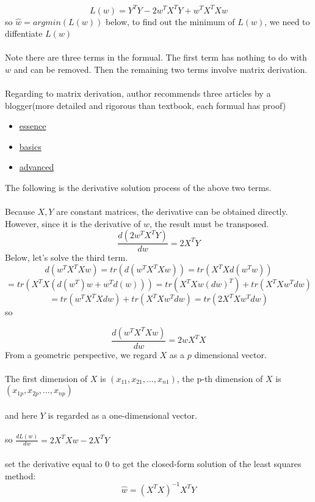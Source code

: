 \documentclass{report}
\begin{document}
$$
L(w)=Y^TY-2w^TX^TY+w^TX^TXw
$$
so $\hat{w}=argmin(L(w))$
below, to find out the minimum of $L(w)$, we need to diffentiate $L(w)$\\\\
Note there are three terms in the formual. The first term has nothing to do with $w$ and can be removed. Then the remaining two terms involve matrix derivation.\\\\
Regarding to matrix derivation, author recommends three articles by a blogger(more detailed and rigorous than textbook, each formual has proof)
\begin{itemize}
	\item \href{https://zhuanlan.zhihu.com/p/263777564}{essence}
	\item \href{https://zhuanlan.zhihu.com/p/273729929}{basics}
	\item \href{https://zhuanlan.zhihu.com/p/288541909}{advanced}
\end{itemize}
The following is the derivative solution process of the above two terms.\\\\
Because $X,Y$ are constant matrices, the derivative can be obtained directly. However, since it is the derivative of $w$, the result must be transposed.
$$
\frac{d(2w^TX^TY)}{dw}=2X^TY
$$
Below, let's solve the third term.
$$
d(w^TX^TXw)=tr(d(w^TX^TXw))=tr(X^TXd(w^Tw))
$$
$$
=tr(X^TX(d(w^T)w+w^Td(w)))=tr(X^TXw(dw)^T)+tr(X^TXw^Tdw)
$$
$$
=tr(w^TX^TXdw)+tr(X^TXw^Tdw)=tr(2X^TXw^Tdw)
$$
so

$$
\frac{d(w^TX^TXw)}{dw}=2wX^TX
$$
From a geometric perspective, we regard $X$ as a $p$ dimensional vector.\\\\
The first dimension of $X$ is $(x_{11},x_{21},...,x_{n1})$, the p-th dimension of $X$ is $(x_{1p},x_{2p},...,x_{np})$\\\\
and here $Y$ is regarded as a one-dimensional vector.\\\\
so $\frac{dL(w)}{dw}=2X^TXw-2X^TY$\\\\
set the derivative equal to 0 to get the closed-form solution of the least squares method:
$$
\hat{w}=(X^TX)^{-1}X^TY
$$
\end{document}
